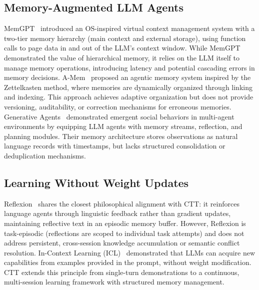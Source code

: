 \documentclass[conference]{IEEEtran}
\begin{document}
\subsection{Memory-Augmented LLM Agents}
MemGPT~\cite{packer2023memgpt} introduced an OS-inspired virtual context management system with a two-tier memory hierarchy (main context and external storage), using function calls to page data in and out of the LLM's context window. While MemGPT demonstrated the value of hierarchical memory, it relies on the LLM itself to manage memory operations, introducing latency and potential cascading errors in memory decisions.
A-Mem~\cite{xu2025amem} proposed an agentic memory system inspired by the Zettelkasten method, where memories are dynamically organized through linking and indexing. This approach achieves adaptive organization but does not provide versioning, auditability, or correction mechanisms for erroneous memories.
Generative Agents~\cite{park2023generative} demonstrated emergent social behaviors in multi-agent environments by equipping LLM agents with memory streams, reflection, and planning modules. Their memory architecture stores observations as natural language records with timestamps, but lacks structured consolidation or deduplication mechanisms.
\subsection{Learning Without Weight Updates}
Reflexion~\cite{shinn2023reflexion} shares the closest philosophical alignment with CTT: it reinforces language agents through linguistic feedback rather than gradient updates, maintaining reflective text in an episodic memory buffer. However, Reflexion is task-episodic (reflections are scoped to individual task attempts) and does not address persistent, cross-session knowledge accumulation or semantic conflict resolution.
In-Context Learning (ICL)~\cite{brown2020language} demonstrated that LLMs can acquire new capabilities from examples provided in the prompt, without weight modification. CTT extends this principle from single-turn demonstrations to a continuous, multi-session learning framework with structured memory management.
\end{document}
